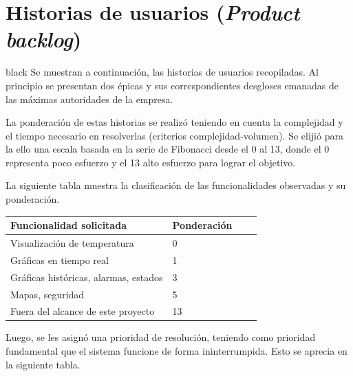 \documentclass[11pt]{charter}
\begin{document}
\section{Historias de usuarios (\textit{Product backlog})}
\label{sec:backlog}

\begin{consigna}{black}
Se muestran a continuación, las historias de usuarios recopiladas. Al principio se presentan dos épicas y sus correspondientes desgloses emanadas de las máximas autoridades de la empresa.

La ponderación de estas historias se realizó teniendo en cuenta la complejidad y el tiempo necesario en resolverlas (criterios complejidad-volumen). Se elijió para la ello una escala basada en la serie de Fibonacci desde el 0 al 13, donde el 0 representa poco esfuerzo y el 13 alto esfuerzo para lograr el objetivo. 

La siguiente tabla muestra la clasificación de las funcionalidades observadas y su ponderación.


\begin{table}[ht]
\begin{tabularx}{\linewidth}{@{}|l|X|X|l|@{}}
\hline
\rowcolor[HTML]{C0C0C0} 
Funcionalidad solicitada           & Ponderación 	\\ \hline

Visualización de temperatura & 0\\ \hline
Gráficas en tiempo real & 1\\ \hline
Gráficas históricas, alarmas, estados & 3\\ \hline
Mapas, seguridad & 5\\ \hline
Fuera del alcance de este proyecto & 13\\ \hline

\end{tabularx}
\end{table}
Luego, se les asignó una prioridad de resolución, teniendo como prioridad fundamental que el sistema funcione de forma ininterrumpida. Esto se aprecia en la siguiente tabla.


\end{consigna}
\end{document}
